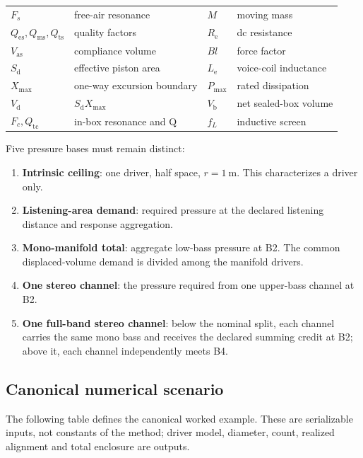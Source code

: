 \documentclass[11pt,a4paper]{article}
\numberwithin{equation}{section}
\newcommand{\Sd}{S_{\mathrm{d}}}
\newcommand{\Xmax}{X_{\mathrm{max}}}
\newcommand{\Vd}{V_{\mathrm{d}}}
\newcommand{\Mms}{M}
\renewcommand{\Re}{R_{\mathrm{e}}}
\newcommand{\Le}{L_{\mathrm{e}}}
\newcommand{\Bl}{Bl}
\newcommand{\Qes}{Q_{\mathrm{es}}}
\newcommand{\Qms}{Q_{\mathrm{ms}}}
\newcommand{\Qts}{Q_{\mathrm{ts}}}
\newcommand{\Qtc}{Q_{\mathrm{tc}}}
\newcommand{\Vas}{V_{\mathrm{as}}}
\newcommand{\Vb}{V_{\mathrm{b}}}
\newcommand{\Pmax}{P_{\mathrm{max}}}
\begin{document}
\begin{center}
\small
\begin{tabular}{@{}llll@{}}
\toprule
$F_s$ & free-air resonance & $\Mms$ & moving mass\\
$\Qes,\Qms,\Qts$ & quality factors & $\Re$ & dc resistance\\
$\Vas$ & compliance volume & $\Bl$ & force factor\\
$\Sd$ & effective piston area & $\Le$ & voice-coil inductance\\
$\Xmax$ & one-way excursion boundary & $\Pmax$ & rated dissipation\\
$\Vd$ & $\Sd\Xmax$ & $\Vb$ & net sealed-box volume\\
$F_c,\Qtc$ & in-box resonance and Q & $f_L$ & inductive screen\\
\bottomrule
\end{tabular}
\end{center}

Five pressure bases must remain distinct:

\begin{enumerate}
	\item[B1.] \textbf{Intrinsic ceiling}: one driver, half space,
	$r=\SI{1}{\meter}$.  This characterizes a driver only.
	\item[B2.] \textbf{Listening-area demand}: required pressure at the declared
	listening distance and response aggregation.
	\item[B3.] \textbf{Mono-manifold total}: aggregate low-bass pressure at
	B2.  The common displaced-volume demand is divided among the manifold
	drivers.
	\item[B4.] \textbf{One stereo channel}: the pressure required from one
	upper-bass channel at B2.
	\item[B5.] \textbf{One full-band stereo channel}: below the nominal
	split, each channel carries the same mono bass and receives the declared
	summing credit at B2; above it, each channel independently meets B4.
\end{enumerate}

\subsection{Canonical numerical scenario}
\label{sec:scope-scenario}

The following table defines the canonical worked example.  These are
serializable inputs, not constants of the method; driver model, diameter,
count, realized alignment and total enclosure are outputs.
\end{document}
